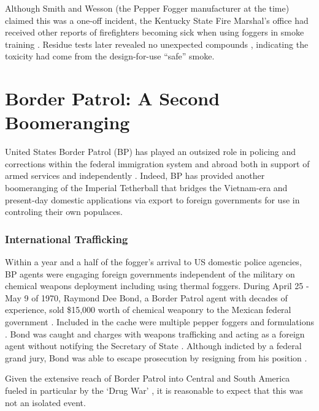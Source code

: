 \documentclass[
  11pt,
]{krantz}
\begin{document}
Although Smith and Wesson (the Pepper Fogger manufacturer at the time) claimed this was a one-off incident, the Kentucky State Fire Marshal's office had received other reports of firefighters becoming sick when using foggers in smoke training \citep{Judd1981}.
Residue tests later revealed no unexpected compounds \citep{TheCourierJournal1982_01_10}, indicating the toxicity had come from the design-for-use ``safe'' smoke.

\hypertarget{CBP}{%
\chapter*{Border Patrol: A Second Boomeranging}\label{CBP}}


United States Border Patrol (BP) has played an outsized role in policing and corrections within the federal immigration system and abroad both in support of armed services and independently \citep{Miller2019}.
Indeed, BP has provided another boomeranging of the Imperial Tetherball that bridges the Vietnam-era and present-day domestic applications via export to foreign governments for use in controling their own populaces.

\hypertarget{international-trafficking}{%
\subsection*{International Trafficking}\label{international-trafficking}}


Within a year and a half of the fogger's arrival to US domestic police agencies, BP agents were engaging foreign governments independent of the military on chemical weapons deployment including using thermal foggers.
During April 25 - May 9 of 1970, Raymond Dee Bond, a Border Patrol agent with decades of experience, sold \$15,000 worth of chemical weaponry to the Mexican federal government \citep{ValleyMorningStar1973_08_04}.
Included in the cache were multiple pepper foggers and formulations \citep{ValleyMorningStar1973_08_04}.
Bond was caught and charges with weapons trafficking and acting as a foreign agent without notifying the Secretary of State \citep{DailyNews1972_10_27}.
Although indicted by a federal grand jury, Bond was able to escape prosecution by resigning from his position \citep{ValleyMorningStar1973_08_04}.

Given the extensive reach of Border Patrol into Central and South America fueled in particular by the `Drug War' \citep{Chepesiuk1999}, it is reasonable to expect that this was not an isolated event.
\end{document}
